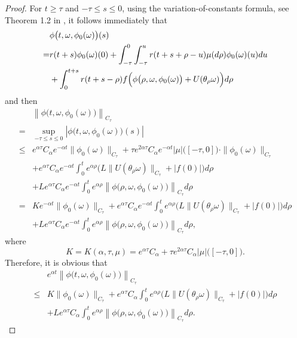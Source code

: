\documentclass[preprint,12pt]{elsarticle}
\begin{document}
\begin{proof}
For $t\geq\tau$ and $-\tau\leq s\leq0$, using the variation-of-constants formula, see Theorem 1.2 in \cite[Chapter 6]{HL}, it follows immediately that
\begin{align}\label{eq28}
&\phi\bigl(t,\omega,\phi_0(\omega)\bigr)(s)\nonumber\\
=&r(t+s)\phi_0(\omega)(0)+\int_{-\tau}^0\int_{-\tau}^{u}r(t+s+\rho-u)\mu(d\rho)\phi_0(\omega)(u)du\nonumber\\
&+\int_0^{t+s}r(t+s-\rho)f\Bigl(\phi\bigl(\rho,\omega,\phi_0(\omega)\bigr)+U(\theta_{\rho}\omega)\Bigr)d\rho
\end{align}
and then
\begin{align}\label{eq29}
&\left\|\phi\bigl(t,\omega,\phi_0(\omega)\bigr)\right\|_{C_\tau}\nonumber\\
=&\sup_{-\tau\leq s\leq0}\left|\phi\bigl(t,\omega,\phi_0(\omega)\bigr)(s)\right|\nonumber\\
\leq&e^{\alpha\tau}C_\alpha e^{-\alpha t}\|\phi_0(\omega)\|_{C_\tau}+\tau e^{2\alpha\tau}C_\alpha e^{-\alpha t}|\mu|\bigl([-\tau,0]\bigr)\cdot\|\phi_0(\omega)\|_{C_\tau}\nonumber\\
&+e^{\alpha\tau}C_\alpha e^{-\alpha t}\int_0^{t}e^{\alpha\rho}\bigl(L\|U(\theta_{\rho}\omega)\|_{C_\tau}+|f(0)|\bigr)d\rho\nonumber\\
&+Le^{\alpha\tau}C_\alpha e^{-\alpha t}\int_0^{t}e^{\alpha\rho}\left\|\phi\bigl(\rho,\omega,\phi_0(\omega)\bigr)\right\|_{C_\tau}d\rho\nonumber\\
=&Ke^{-\alpha t}\|\phi_0(\omega)\|_{C_\tau}+e^{\alpha\tau}C_\alpha e^{-\alpha t}\int_0^{t}e^{\alpha\rho}\bigl(L\|U(\theta_{\rho}\omega)\|_{C_\tau}+|f(0)|\bigr)d\rho\nonumber\\
&+Le^{\alpha\tau}C_\alpha e^{-\alpha t}\int_0^{t}e^{\alpha\rho}\left\|\phi\bigl(\rho,\omega,\phi_0(\omega)\bigr)\right\|_{C_\tau}d\rho,
\end{align}
where
\[K=K(\alpha,\tau,\mu)=e^{\alpha\tau}C_\alpha+\tau e^{2\alpha\tau}C_\alpha|\mu|\bigl([-\tau,0]\bigr).\]
Therefore, it is obvious that
\begin{align}\label{eq30}
&e^{\alpha t}\left\|\phi\bigl(t,\omega,\phi_0(\omega)\bigr)\right\|_{C_\tau}\nonumber\\
\leq&K\|\phi_0(\omega)\|_{C_\tau}+e^{\alpha\tau}C_\alpha\int_0^{t}e^{\alpha\rho}\bigl(L\|U(\theta_{\rho}\omega)\|_{C_\tau}+|f(0)|\bigr)d\rho\nonumber\\
&+Le^{\alpha\tau}C_\alpha\int_0^{t}e^{\alpha\rho}\left\|\phi\bigl(\rho,\omega,\phi_0(\omega)\bigr)\right\|_{C_\tau}d\rho.
\end{align}

\end{proof}
\end{document}
